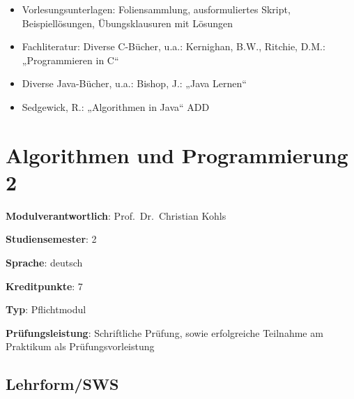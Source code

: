 \begin{itemize}
\tightlist
\item
  Vorlesungsunterlagen: Foliensammlung, ausformuliertes Skript,
  Beispiellösungen, Übungsklausuren mit Lösungen
\item
  Fachliteratur: Diverse C-Bücher, u.a.: Kernighan, B.W., Ritchie, D.M.:
  „Programmieren in C``
\item
  Diverse Java-Bücher, u.a.: Bishop, J.: „Java Lernen``
\item
  Sedgewick, R.: „Algorithmen in Java`` ADD
\end{itemize}

\hypertarget{algorithmen-und-programmierung-2pathlabelmi-2017modulbeschreibungen-bachelorba_algorithmenundprogrammierung2}{%
\chapter{Algorithmen und Programmierung
2\label{/mi-2017/modulbeschreibungen-bachelor/BA_AlgorithmenundProgrammierung2}}\label{algorithmen-und-programmierung-2pathlabelmi-2017modulbeschreibungen-bachelorba_algorithmenundprogrammierung2}}

\begin{modulHead}
\textbf{Modulverantwortlich}: Prof.~Dr.~Christian
Kohls
\end{modulHead}
\begin{modulHead}
\textbf{Studiensemester}:
2
\end{modulHead}
\begin{modulHead}
\textbf{Sprache}:
deutsch
\end{modulHead}
\begin{modulHead}
\textbf{Kreditpunkte}:
7
\end{modulHead}
\begin{modulHead}
\textbf{Typ}:
Pflichtmodul
\end{modulHead}
\begin{modulHead}
\textbf{Prüfungsleistung}:
Schriftliche Prüfung, sowie erfolgreiche Teilnahme am Praktikum als
Prüfungsvorleistung
\end{modulHead}


\hypertarget{lehrformswspathlabelmi-2017modulbeschreibungen-bachelorba_algorithmenundprogrammierung2}{%
\section*{Lehrform/SWS\label{/mi-2017/modulbeschreibungen-bachelor/BA_AlgorithmenundProgrammierung2}}\label{lehrformswspathlabelmi-2017modulbeschreibungen-bachelorba_algorithmenundprogrammierung2}}

